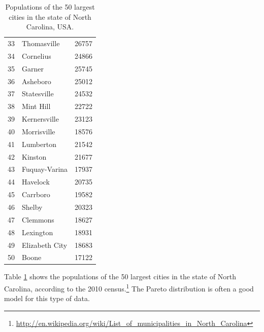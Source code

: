\documentclass[12pt]{article}
\begin{document}
\begin{table}
\begin{tabular}{clr}
33  &  Thomasville  &  26757 \\
34  &  Cornelius  &  24866 \\
35  &  Garner  &  25745 \\
36  &  Asheboro   &  25012 \\
37  &  Statesville   &  24532 \\
38  &  Mint Hill  &  22722 \\
39  &  Kernersville  &  23123 \\
40  &  Morrisville  &  18576 \\
41  &  Lumberton   &  21542 \\
42  &  Kinston   &  21677 \\
43  &  Fuquay-Varina  &  17937 \\
44  &  Havelock  &  20735 \\
45  &  Carrboro  &  19582 \\
46  &  Shelby   &  20323 \\
47  &  Clemmons  &  18627 \\
48  &  Lexington   &  18931 \\
49  &  Elizabeth City   &  18683 \\
50  &  Boone   &  17122 \\
\hline
\end{tabular}
\vspace{1em}
\caption{Populations of the 50 largest cities in the state of North Carolina, USA.}
\label{table:cities}
\end{table}


Table \ref{table:cities} shows the populations of the 50 largest cities in the state of North Carolina, according to the 2010 census.\footnote{\url{http://en.wikipedia.org/wiki/List_of_municipalities_in_North_Carolina}} The Pareto distribution is often a good model for this type of data.
\end{document}
